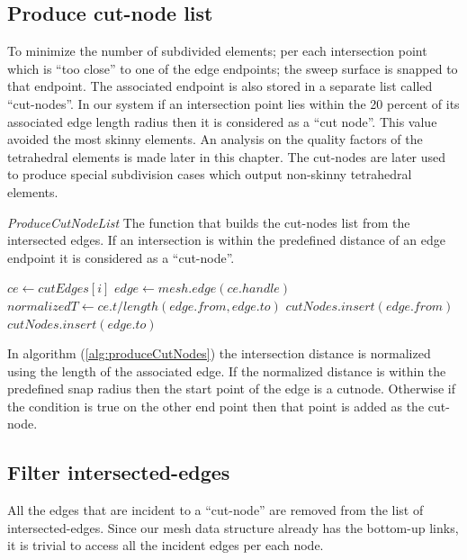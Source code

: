 \subsection{Produce cut-node list}
To minimize the number of subdivided elements; per each intersection point which is ``too close'' to one of the edge endpoints; 
the sweep surface is snapped to that endpoint. The associated endpoint is also stored in a separate list called ``cut-nodes''. 
In our system if an intersection point lies within the 20 percent of its associated edge length radius then it is considered 
as a ``cut node''. This value avoided the most skinny elements. An analysis on the quality factors of the tetrahedral elements 
is made later in this chapter. The cut-nodes are later used to produce special subdivision cases which output non-skinny 
tetrahedral elements.

\begin{algorithm}[H]
\caption{\textit{ProduceCutNodeList} The function that builds the cut-nodes list from the intersected edges.
If an intersection is within the predefined distance of an edge endpoint it is considered as a ``cut-node''.}
\label{alg:produceCutNodes}
\begin{algorithmic}[1]	
  \STATE $ce \gets cutEdges\left[i\right]$
  \STATE $edge \gets mesh.edge(ce.handle)$
  \STATE $normalizedT \gets ce.t / length(edge.from, edge.to)$
  \STATE $cutNodes.insert(edge.from)$
  \ELSE
    \STATE $cutNodes.insert(edge.to)$
    \ENDIF
  \ENDIF
  \ENDFOR
\end{algorithmic}
\end{algorithm}

In algorithm (\ref{alg:produceCutNodes}) the intersection distance is normalized using the length of the associated edge.
If the normalized distance is within the predefined snap radius then the start point of the edge is a cutnode. Otherwise
if the condition is true on the other end point then that point is added as the cut-node.

\subsection{Filter intersected-edges}
All the edges that are incident to a ``cut-node'' are removed from the list of intersected-edges. Since our mesh data structure 
already has the bottom-up links, it is trivial to access all the incident edges per each node. 


